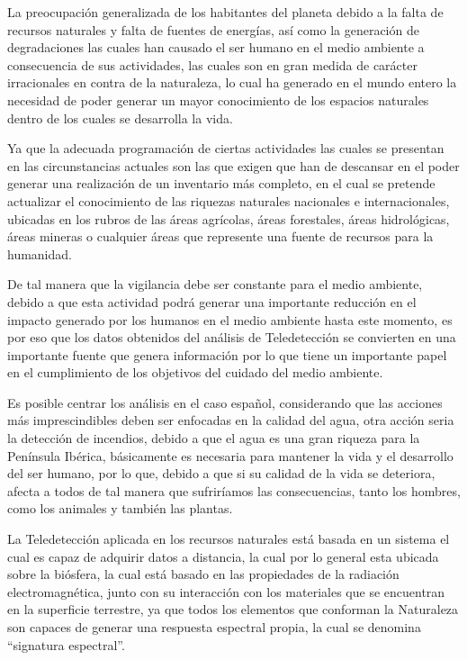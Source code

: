 La preocupación generalizada de los habitantes del planeta debido a la falta de recursos naturales y falta de fuentes de energías, así como la generación de degradaciones las cuales han causado el ser humano en el medio ambiente a consecuencia de sus actividades, las cuales son en gran medida de carácter irracionales en contra de la naturaleza, lo cual ha generado en el mundo entero la necesidad de poder generar un mayor conocimiento de los espacios naturales dentro de los cuales se desarrolla la vida. 

Ya que la adecuada programación de ciertas actividades las cuales se presentan en las circunstancias actuales son las que exigen que han de descansar en el poder generar una realización de un inventario más completo, en el cual se pretende actualizar el conocimiento de las riquezas naturales nacionales e internacionales, ubicadas en los rubros de las áreas agrícolas, áreas forestales, áreas hidrológicas, áreas mineras o cualquier áreas que represente una fuente de recursos para la humanidad. \cite{Romero2007}

De tal manera que la vigilancia debe ser constante para el medio ambiente, debido a que esta actividad podrá generar una importante reducción en el impacto generado por los humanos en el medio ambiente hasta este momento, es por eso que los datos obtenidos del análisis de Teledetección se convierten en una importante fuente que genera información por lo que tiene un importante papel en el cumplimiento de los objetivos del cuidado del medio ambiente.

Es posible centrar los análisis en el caso español, considerando que las acciones más imprescindibles deben ser enfocadas en la calidad del agua, otra acción seria la detección de incendios, debido a que el agua es una gran riqueza para la Península Ibérica, básicamente es necesaria para mantener la vida y el desarrollo del ser humano, por lo que, debido a que si su calidad de la vida se deteriora, afecta a todos de tal manera que sufriríamos las consecuencias, tanto los hombres, como los animales y también las plantas. 

La Teledetección aplicada en los recursos naturales está basada en un sistema el cual es capaz de adquirir datos a distancia, la cual por lo general esta ubicada sobre la biósfera, la cual está basado en las propiedades de la radiación electromagnética, junto con su interacción con los materiales que se encuentran en la superficie terrestre, ya que todos los elementos que conforman la Naturaleza son capaces de generar una respuesta espectral propia, la cual se denomina “signatura espectral”.

